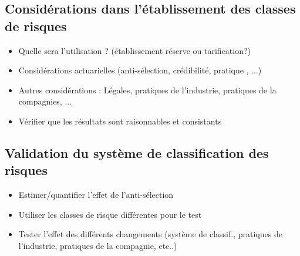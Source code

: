 \subsection{Considérations dans l'établissement des classes de risques}
\begin{itemize}
\item Quelle sera l'utilisation ? (établissement réserve ou tarification?)
\item Considérations actuarielles (anti-sélection, crédibilité, pratique , ...)
\item Autres considérations : Légales, pratiques de l'industrie, pratiques de la compagnies, ...
\item Vérifier que les résultats sont raisonnables et consistants
\end{itemize}

\subsection{Validation du système de classification des risques}
\begin{itemize}
\item Estimer/quantifier l'effet de l'anti-sélection
\item Utiliser les classes de risque différentes pour le test
\item Tester l'effet des différents changements (système de classif., pratiques de l'industrie, pratiques de la compagnie, etc..)
\end{itemize}